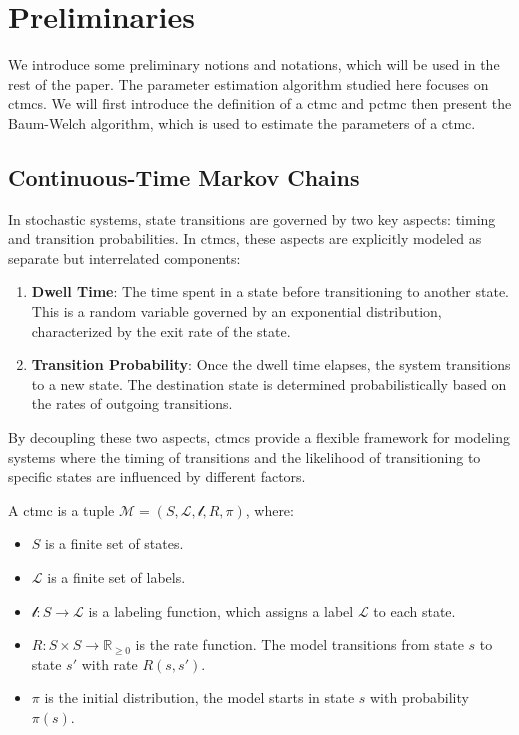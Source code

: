\section{Preliminaries}\label{sec:preliminaries}
We introduce some preliminary notions and notations, which will be used in the rest of the paper.
The parameter estimation algorithm studied here focuses on \glspl{ctmc}.
We will first introduce the definition of a \gls{ctmc} and \gls{pctmc} then present the Baum-Welch algorithm, which is used to estimate the parameters of a \gls{ctmc}.

\subsection{Continuous-Time Markov Chains}\label{subsec:ctmc}
In stochastic systems, state transitions are governed by two key aspects: timing and transition probabilities.
In \glspl{ctmc}, these aspects are explicitly modeled as separate but interrelated components:

\begin{enumerate}
    \item \textbf{Dwell Time}: The time spent in a state before transitioning to another state.
    This is a random variable governed by an exponential distribution, characterized by the exit rate of the state.
    \item \textbf{Transition Probability}: Once the dwell time elapses, the system transitions to a new state.
    The destination state is determined probabilistically based on the rates of outgoing transitions.
\end{enumerate}
By decoupling these two aspects, \glspl{ctmc} provide a flexible framework for modeling systems where the timing of transitions and the likelihood of transitioning to specific states are influenced by different factors.


\begin{definition}
    A \gls{ctmc} is a tuple $\mathcal{M} = (S, \mathcal{L}, \mathscr{l}, R, \pi)$, where:
    \begin{itemize}
        \item $S$ is a finite set of states.
        \item $\mathcal{L}$ is a finite set of labels.
        \item $\mathscr{l}: S \rightarrow \mathcal{L}$ is a labeling function, which assigns a label $\mathcal{L}$ to each state.
        \item $R: S \times S \rightarrow \mathbb{R}_{\geq 0}$ is the rate function.
        The model transitions from state $s$ to state $s'$ with rate $R(s, s')$.
        \item $\pi$ is the initial distribution, the model starts in state $s$ with probability $\pi(s)$.
    \end{itemize}
\end{definition}

